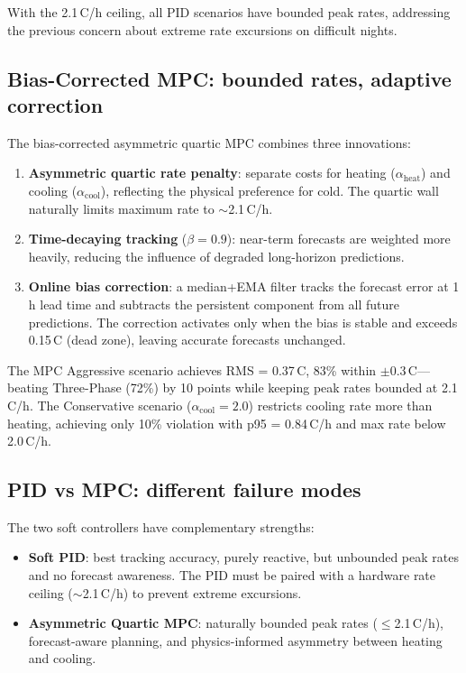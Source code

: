 \documentclass[11pt]{article}
\begin{document}
With the 2.1\,\textdegree C/h ceiling, all PID scenarios have bounded peak
rates, addressing the previous concern about extreme rate excursions on
difficult nights.

\subsection{Bias-Corrected MPC: bounded rates, adaptive correction}

The bias-corrected asymmetric quartic MPC combines three innovations:
\begin{enumerate}
  \item \textbf{Asymmetric quartic rate penalty}: separate costs for heating
    ($\alpha_\mathrm{heat}$) and cooling ($\alpha_\mathrm{cool}$), reflecting
    the physical preference for cold.  The quartic wall naturally limits
    maximum rate to $\sim$2.1\,\textdegree C/h.
  \item \textbf{Time-decaying tracking} ($\beta = 0.9$): near-term forecasts
    are weighted more heavily, reducing the influence of degraded long-horizon
    predictions.
  \item \textbf{Online bias correction}: a median+EMA filter tracks the
    forecast error at 1\,h lead time and subtracts the persistent component
    from all future predictions.  The correction activates only when the
    bias is stable and exceeds 0.15\,\textdegree C (dead zone), leaving
    accurate forecasts unchanged.
\end{enumerate}

The MPC Aggressive scenario achieves RMS = 0.37\,\textdegree C,
83\% within $\pm$0.3\,\textdegree C---beating Three-Phase (72\%) by 10 points
while keeping peak rates bounded at 2.1\,\textdegree C/h.  The Conservative
scenario ($\alpha_\mathrm{cool} = 2.0$) restricts cooling rate more than
heating, achieving only 10\% violation with p95 = 0.84\,\textdegree C/h and
max rate below 2.0\,\textdegree C/h.

\subsection{PID vs MPC: different failure modes}

The two soft controllers have complementary strengths:
\begin{itemize}
  \item \textbf{Soft PID}: best tracking accuracy, purely reactive, but
    unbounded peak rates and no forecast awareness.  The PID must be paired
    with a hardware rate ceiling ($\sim$2.1\,\textdegree C/h) to prevent
    extreme excursions.
  \item \textbf{Asymmetric Quartic MPC}: naturally bounded peak rates
    ($\leq$2.1\,\textdegree C/h), forecast-aware planning, and
    physics-informed asymmetry between heating and cooling.
\end{itemize}
\end{document}
